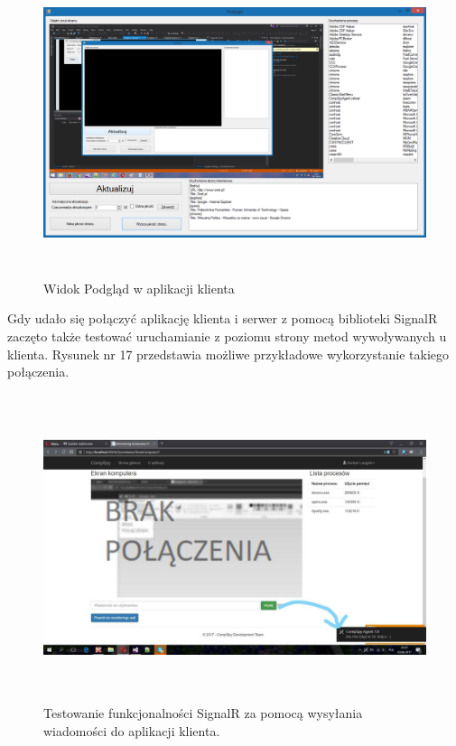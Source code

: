 \begin{figure} [!ht]
    \centering
    \includegraphics[height=9cm,width=16cm]{comspy_testy3}
    \caption{Widok Podgląd w aplikacji klienta}
    \label{fig:my_label}
\end{figure}

\newpage
Gdy udało się połączyć aplikację klienta i serwer z pomocą biblioteki SignalR zaczęto także testować uruchamianie z poziomu strony metod wywoływanych u klienta. Rysunek nr 17 przedstawia możliwe przykładowe wykorzystanie takiego połączenia.

\begin{figure} [!ht]
    \centering
    \includegraphics[height=9cm,width=16cm]{comspy_testy4}
    \caption{Testowanie funkcjonalności SignalR za pomocą wysyłania wiadomości do aplikacji klienta.}
    \label{fig:my_label}
\end{figure}

